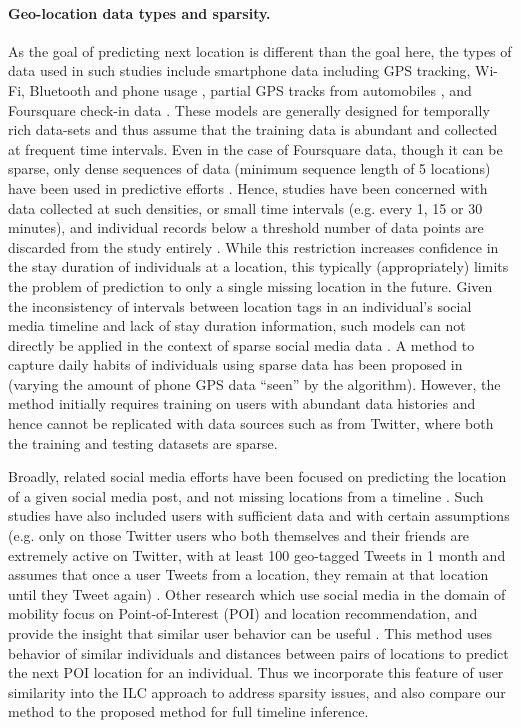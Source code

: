\paragraph{Geo-location data types and sparsity.} As the goal of predicting next location is different than the goal here, the types of data used in such studies include smartphone data including GPS tracking, Wi-Fi, Bluetooth and phone usage \cite{68}, partial GPS tracks from automobiles \cite{122}, and Foursquare check-in data \cite{67}. These models are generally designed for temporally rich data-sets and thus assume that the training data is abundant and collected at frequent time intervals. Even in the case of Foursquare data, though it can be sparse, only dense sequences of data (minimum sequence length of 5 locations) have been used in predictive efforts \cite{feng2018deepmove}. Hence, studies have been concerned with data collected at such densities, or small time intervals (e.g. every 1, 15 or 30 minutes), and individual records below a threshold number of data points are discarded from the study entirely \cite{56,67,70,74,feng2018deepmove}. While this restriction increases confidence in the stay duration of individuals at a location, this typically (appropriately) limits the problem of prediction to only a single missing location in the future. Given the inconsistency of intervals between location tags in an individual's social media timeline and lack of stay duration information, such models can not directly be applied in the context of sparse social media data \cite{tasse2017state}. A method to capture daily habits of individuals using sparse data has been proposed in \cite{137} (varying the amount of phone GPS data ``seen'' by the algorithm). However, the method initially requires training on users with abundant data histories and hence cannot be replicated with data sources such as from Twitter, where both the training and testing datasets are sparse.

Broadly, related social media efforts have been focused on predicting the location of a given social media post, and not missing locations from a timeline \cite{jurgens2015geolocation}. Such studies have also included users with sufficient data and with certain assumptions (e.g. only on those Twitter users who both themselves and their friends are extremely active on Twitter, with at least 100 geo-tagged Tweets in 1 month and assumes that once a user Tweets from a location, they remain at that location until they Tweet again) \cite{104}. Other research which use social media in the domain of mobility focus on Point-of-Interest (POI) and location recommendation, and provide the insight that similar user behavior can be useful \cite{139}. This method uses behavior of similar individuals and distances between pairs of locations to predict the next POI location for an individual. Thus we incorporate this feature of user similarity into the ILC approach to address sparsity issues, and also compare our method to the proposed method for full timeline inference.

